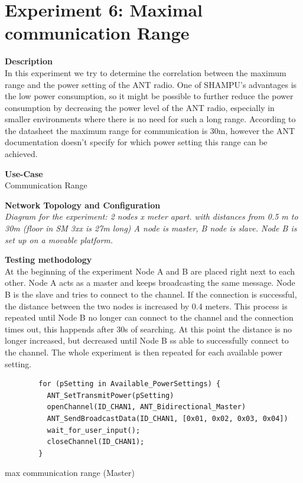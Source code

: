 \section{Experiment 6: Maximal communication Range}
\begin{description} 
	\item{\textbf{Description}} \hfill \\  In this experiment we try to determine the correlation between the maximum range and the power setting of the ANT radio. One of SHAMPU's advantages is the low power consumption, so it might be possible to further reduce the power consumption by decreasing the power level of the ANT radio, especially in smaller environments where there is no need for such a long range. According to the datasheet the maximum range for communication is 30m, however the ANT documentation doesn't specify for which power setting this range can be achieved. 

	\item{\textbf{Use-Case}} \hfill \\ Communication Range		
	\item{\textbf{Network Topology and Configuration}} \hfill \\ \textit{Diagram for the experiment:  2 nodes   x meter apart.  with distances from 0.5 m to 30m  (floor in SM 3xx is 27m long)  A node is master, B node is slave. Node B is set up on a movable platform.}\\  

	\item{\textbf{Testing methodology}} \hfill \\ At the beginning of the experiment Node A and B are placed right next to each other. Node A acts as a master and keeps broadcasting the same message. Node B is the slave and tries to connect to the channel. If the connection is successful, the distance between the two nodes is increased by 0.4 meters. This process is repeated until Node B no longer can connect to the channel and the connection times out, this happends after 30s of searching. At this point the distance is no longer increased, but decreased until Node B ss able to successfully connect to the channel. The whole experiment is then repeated for each available power setting.
	
	\begin{code}[H]
		\begin{verbatim}
		for (pSetting in Available_PowerSettings) {
		  ANT_SetTransmitPower(pSetting)
		  openChannel(ID_CHAN1, ANT_Bidirectional_Master)
		  ANT_SendBroadcastData(ID_CHAN1, [0x01, 0x02, 0x03, 0x04])
		  wait_for_user_input();
		  closeChannel(ID_CHAN1);
		}
		\end{verbatim}
		\caption{max communication range (Master)}\label{lst:mExp6}
	\end{code}
	

\end{description}
